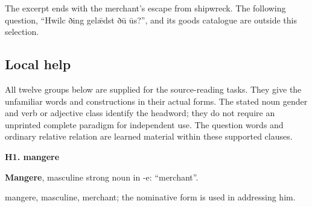 \par\begin{minipage}{\linewidth}\raggedright




\end{minipage}\par
The excerpt ends with the merchant’s escape from shipwreck. The following question, “Hwilc ðing gelǣdst ðū ūs?”, and its goods catalogue are outside this selection.

\subsection*{Local help}

All twelve groups below are supplied for the source-reading tasks. They give the unfamiliar words and constructions in their actual forms. The stated noun gender and verb or adjective class identify the headword; they do not require an unprinted complete paradigm for independent use. The question words and ordinary relative relation are learned material within these supported clauses.

\par\begin{minipage}{\linewidth}\raggedright
\textbf{H1. mangere}

\textbf{Mangere}, masculine strong noun in -e: “merchant”.

mangere, masculine, merchant; the nominative form is used in addressing him.

\end{minipage}\par\addvspace{4pt}

